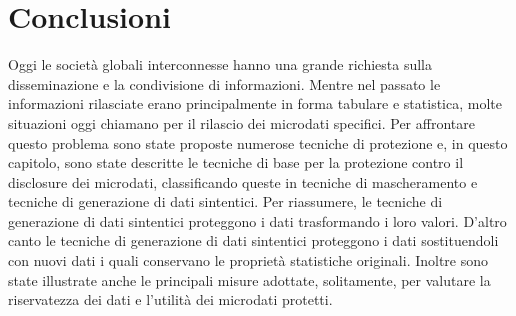 \section{Conclusioni}
Oggi le società globali interconnesse hanno una grande richiesta sulla disseminazione e la condivisione di informazioni. Mentre nel passato le informazioni rilasciate erano principalmente in forma tabulare e statistica, molte situazioni oggi chiamano per il rilascio dei microdati specifici. 
Per affrontare questo problema sono state proposte numerose tecniche di protezione e, in questo capitolo, sono state descritte le tecniche di base per la protezione contro il disclosure dei microdati, classificando queste in tecniche di mascheramento e tecniche di generazione di dati sintentici. Per riassumere, le tecniche di generazione di dati sintentici proteggono i dati trasformando i loro valori. D'altro canto le tecniche di generazione di dati sintentici proteggono i dati sostituendoli con nuovi dati i quali conservano le proprietà statistiche originali. Inoltre sono state illustrate anche le principali misure adottate, solitamente, per valutare la riservatezza dei dati e l'utilità dei microdati protetti.